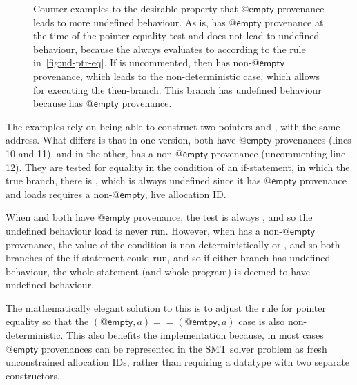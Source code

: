 \begin{figure}
    \caption{Counter-examples to the desirable property that
    $@\mathsf{empty}$ provenance leads to more undefined behaviour.  As is,
     has $@\mathsf{empty}$ provenance at the time of the pointer
    equality test and does not lead to undefined behaviour, because the
     always evaluates to  according to the rule
    in~\cref{fig:nd-ptr-eq}. If  is uncommented, then
     has non-$@\mathsf{empty}$ provenance, which leads to the
    non-deterministic case, which allows for executing the then-branch. This
    branch has undefined behaviour because  has $@\mathsf{empty}$
    provenance.}\label{fig:non-det-ptr-eq-problem}
\end{figure}

The examples rely on being able to construct two pointers  and
, with the same address. What differs is that in one version, both
have $@\mathsf{empty}$ provenances (lines 10 and 11), and in the other,
 has a non-$@\mathsf{empty}$ provenance (uncommenting line 12). They
are tested for equality in the condition of an if-statement, in which the true
branch, there is
, which is always undefined since it has $@\mathsf{empty}$
provenance and loads requires a non-$@\mathsf{empty}$, live allocation ID\@.

When  and  both have $@\mathsf{empty}$ provenance, the
test is always , and so the undefined behaviour load is never run. However, when
 has a non-$@\mathsf{empty}$ provenance, the value of the condition
is non-deterministically  or , and so both branches
of the if-statement could run, and so if either branch has undefined behaviour,
the whole statement (and whole program) is deemed to have undefined behaviour.

The mathematically elegant solution to this is to adjust the rule for pointer
equality so that the $(@\mathsf{empty}, a) == (@\mathsf{emtpy}, a)$ case is also
non-deterministic. This also benefits the  implementation because, in
most cases
$@\mathsf{empty}$ provenances can be represented in the SMT solver problem as
fresh unconstrained allocation IDs, rather than requiring a datatype with two
separate constructors.

